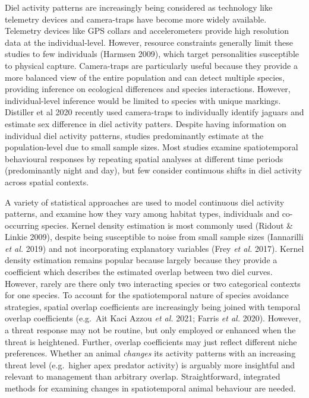 \documentclass[11pt,a4paper,titlepage,twoside,openright]{style/unimelbthesis}
\begin{document}
\begin{mainmatter}
Diel activity patterns are increasingly being considered as technology like telemetry devices and camera-traps have become more widely available. Telemetry devices like GPS collars and accelerometers provide high resolution data at the individual-level. However, resource constraints generally limit these studies to few individuals (Harmsen 2009), which target personalities susceptible to physical capture. Camera-traps are particularly useful because they provide a more balanced view of the entire population and can detect multiple species, providing inference on ecological differences and species interactions. However, individual-level inference would be limited to species with unique markings. Distiller et al 2020 recently used camera-traps to individually identify jaguars and estimate sex difference in diel activity patters. Despite having information on individual diel activity patterns, studies predominantly estimate at the population-level due to small sample sizes. Most studies examine spatiotemporal behavioural responses by repeating spatial analyses at different time periods (predominantly night and day), but few consider continuous shifts in diel activity across spatial contexts.

A variety of statistical approaches are used to model continuous diel activity patterns, and examine how they vary among habitat types, individuals and co-occurring species. Kernel density estimation is most commonly used (Ridout \& Linkie 2009), despite being susceptible to noise from small sample sizes (Iannarilli \emph{et al.} 2019) and not incorporating explanatory variables (Frey \emph{et al.} 2017). Kernel density estimation remains popular because largely because they provide a coefficient which describes the estimated overlap between two diel curves. However, rarely are there only two interacting species or two categorical contexts for one species. To account for the spatiotemporal nature of species avoidance strategies, spatial overlap coefficients are increasingly being joined with temporal overlap coefficients (e.g.~Ait Kaci Azzou \emph{et al.} 2021; Farris \emph{et al.} 2020). However, a threat response may not be routine, but only employed or enhanced when the threat is heightened. Further, overlap coefficients may just reflect different niche preferences. Whether an animal \emph{changes} its activity patterns with an increasing threat level (e.g.~higher apex predator activity) is arguably more insightful and relevant to management than arbitrary overlap. Straightforward, integrated methods for examining changes in spatiotemporal animal behaviour are needed.


\end{mainmatter}
\end{document}
